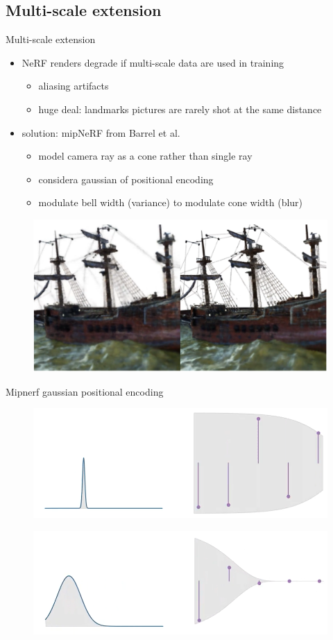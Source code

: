 \documentclass[aspectratio=1610,handout]{beamer}
\begin{document}
\subsection{Multi-scale extension}
\begin{frame}{Multi-scale extension}
    \begin{itemize}
        \item NeRF renders degrade if multi-scale data are used in training 
        \begin{itemize}
            \item aliasing artifacts
            \item huge deal: landmarks pictures are rarely shot at the same distance
        \end{itemize}
        \item solution: mipNeRF from Barrel et al.
        \begin{itemize}
            \item model camera ray as a cone rather than single ray
            \item considera gaussian of positional encoding
            \item modulate bell width (variance) to modulate cone width (blur)
        \end{itemize}
    \end{itemize}
    \bigskip
    \begin{figure}[H]
        \includegraphics[width=.4\textwidth]{mipnerf-results.png}
    \end{figure}
\end{frame}

\begin{frame}{Mipnerf gaussian positional encoding}
    \begin{figure}[H]
        \includegraphics[width=.6\textwidth]{mipnerf-narrow.png}
    \end{figure}
    \begin{figure}[H]
        \includegraphics[width=.6\textwidth]{mipnerf-wide.png}
    \end{figure}
\end{frame}
\end{document}
